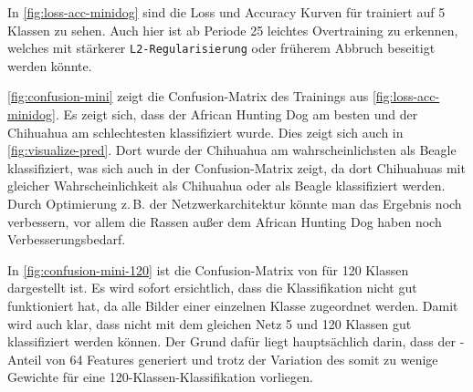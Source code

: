 In \autoref{fig:loss-acc-minidog} sind die Loss und Accuracy Kurven für \MiniDog{}
trainiert auf 5 Klassen zu sehen. Auch hier ist ab Periode 25 leichtes
Overtraining zu erkennen, welches mit stärkerer \texttt{L2-Regularisierung} oder
früherem Abbruch beseitigt werden könnte.

\autoref{fig:confusion-mini} zeigt die Confusion-Matrix des Trainings aus
\autoref{fig:loss-acc-minidog}. Es zeigt sich, dass der African Hunting Dog am
besten und der Chihuahua am schlechtesten klassifiziert wurde. Dies zeigt sich
auch in \autoref{fig:visualize-pred}. Dort wurde der Chihuahua am
wahrscheinlichsten als Beagle klassifiziert, was sich auch in der
Confusion-Matrix zeigt, da dort Chihuahuas mit gleicher Wahrscheinlichkeit als
Chihuahua oder als Beagle klassifiziert werden. Durch Optimierung z.\,B. der
Netzwerkarchitektur könnte man das Ergebnis noch verbessern, vor allem die Rassen
außer dem African Hunting Dog haben noch Verbesserungsbedarf.

In \autoref{fig:confusion-mini-120} ist die Confusion-Matrix von \MiniDog{} für
120 Klassen dargestellt ist. Es wird sofort ersichtlich, dass die Klassifikation
nicht gut funktioniert hat, da alle Bilder einer einzelnen Klasse zugeordnet
werden. Damit wird auch klar, dass nicht mit dem gleichen Netz 5 und 120 Klassen
gut klassifiziert werden können. Der Grund dafür liegt hauptsächlich darin, dass
der \CNN{}-Anteil von \MiniDog{} 64 Features generiert und trotz der Variation
des \FNC{} somit zu wenige Gewichte für eine 120-Klassen-Klassifikation vorliegen.

